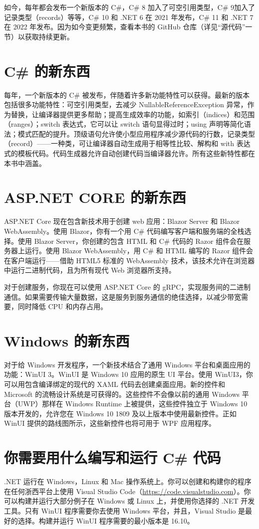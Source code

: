 如今，每年都会发布一个新版本的 C\#，C\# 8 加入了可空引用类型，C\# 9加入了记录类型（records）等等，C\# 10 和 .NET 6 在 2021 年发布，C\# 11 和 .NET 7 在 2022 年发布。因为如今变更频繁，查看本书的 GitHub 仓库（详见“源代码”一节）以获取持续更新。

\section*{C\# 的新东西}
每年，一个新版本的 C\# 被发布，伴随着许多新功能特性可以获得。最新的版本包括很多功能特性：可空引用类型，去减少 NullableReferenceException 异常，作为替换，让编译器提供更多帮助；提高生成效率的功能，如索引（indices）和范围（ranges）；switch 表达式，它可以让 switch 语句显得过时；using 声明等简化语法；模式匹配的提升。顶级语句允许使小型应用程序减少源代码的行数，记录类型（record）——一种类，可让编译器自动生成用于相等性比较、解构和 with 表达式的模板代码。代码生成器允许自动创建代码当编译器允许。所有这些新特性都在本书中涵盖。

\section*{ASP.NET CORE 的新东西}
ASP.NET Core 现在包含新技术用于创建 web 应用：Blazor Server 和 Blazor WebAssembly。使用 Blazor，你有一个用 C\# 代码编写客户端和服务端的全栈选择。使用 Blazor Server，你创建的包含 HTML 和 C\# 代码的 Razor 组件会在服务器上运行。使用 Blazor WebAssembly，用 C\# 和 HTML 编写的 Razor 组件会在客户端运行——借助 HTML5 标准的 WebAssembly 技术，该技术允许在浏览器中运行二进制代码，且为所有现代 Web 浏览器所支持。

对于创建服务，你现在可以使用 ASP.NET Core 的 gRPC，实现服务间的二进制通信。如果需要传输大量数据，这是服务到服务通信的绝佳选择，以减少带宽需要，同时降低 CPU 和内存占用。

\section*{Windows 的新东西}
对于给 Windows 开发程序，一个新技术结合了通用 Windows 平台和桌面应用的功能：WinUI 3。WinUI 是 Windows 10 应用的原生 UI 平台。使用 WinUI3，你可以用包含编译绑定的现代的 XAML 代码去创建桌面应用。新的控件和 Microsoft 的流畅设计系统是可获得的。这些控件不会像以前的通用 Windows 平台（UWP）那样在 Windows Runtime 上被提供，这些控件独立于 Windows 10 版本开发的，允许您在 Windows 10 1809 及以上版本中使用最新控件。正如 WinUI 提供的路线图所示，这些新控件也将可用于 WPF 应用程序。

\section*{你需要用什么编写和运行 C\# 代码}
.NET 运行在 Windows，Linux 和 Mac 操作系统上。你可以创建和构建你的程序在任何浙西平台上使用 Visual Studio Code（\url{https://code.visualstudio.com}）。你可以构建并运行大部分例子在 Windows 或 Linux 上，并使用你选择的 .NET 开发工具。只有 WinUI 程序需要你去使用 Windows 平台，并且，Visual Studio 是最好的选择。构建并运行 WinUI 程序需要的最小版本是 16.10。

